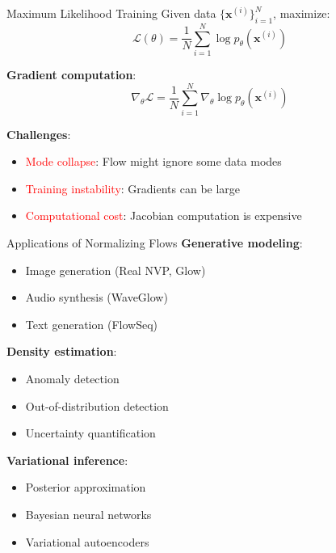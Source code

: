 \documentclass[aspectratio=169]{beamer}
\begin{document}
\begin{frame}{Maximum Likelihood Training}
Given data $\{\mathbf{x}^{(i)}\}_{i=1}^N$, maximize:
\begin{equation}
    \mathcal{L}(\theta) = \frac{1}{N} \sum_{i=1}^N \log p_\theta(\mathbf{x}^{(i)})
\end{equation}

\textbf{Gradient computation}:
\begin{equation}
    \nabla_\theta \mathcal{L} = \frac{1}{N} \sum_{i=1}^N \nabla_\theta \log p_\theta(\mathbf{x}^{(i)})
\end{equation}

\textbf{Challenges}:
\begin{itemize}
    \item \textcolor{red}{Mode collapse}: Flow might ignore some data modes
    \item \textcolor{red}{Training instability}: Gradients can be large
    \item \textcolor{red}{Computational cost}: Jacobian computation is expensive
\end{itemize}
\end{frame}

\begin{frame}{Applications of Normalizing Flows}
\textbf{Generative modeling}:
\begin{itemize}
    \item Image generation (Real NVP, Glow)
    \item Audio synthesis (WaveGlow)
    \item Text generation (FlowSeq)
\end{itemize}

\textbf{Density estimation}:
\begin{itemize}
    \item Anomaly detection
    \item Out-of-distribution detection
    \item Uncertainty quantification
\end{itemize}

\textbf{Variational inference}:
\begin{itemize}
    \item Posterior approximation
    \item Bayesian neural networks
    \item Variational autoencoders
\end{itemize}
\end{frame}
\end{document}
